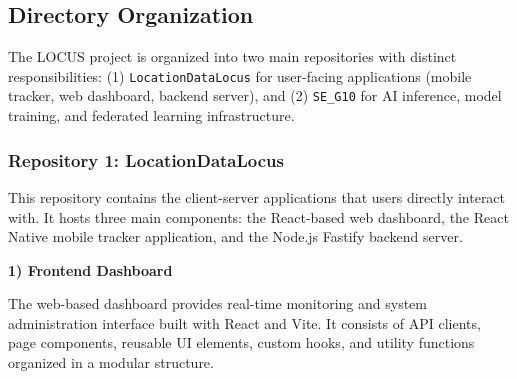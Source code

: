 \documentclass[conference]{IEEEtran}
\begin{document}
\subsection{Directory Organization}

The LOCUS project is organized into two main repositories with distinct responsibilities: (1) \texttt{LocationDataLocus} for user-facing applications (mobile tracker, web dashboard, backend server), and (2) \texttt{SE\_G10} for AI inference, model training, and federated learning infrastructure.

\subsubsection{Repository 1: LocationDataLocus}

This repository contains the client-server applications that users directly interact with. It hosts three main components: the React-based web dashboard, the React Native mobile tracker application, and the Node.js Fastify backend server.

\textbf{1) Frontend Dashboard}

The web-based dashboard provides real-time monitoring and system administration interface built with React and Vite. It consists of API clients, page components, reusable UI elements, custom hooks, and utility functions organized in a modular structure.
\end{document}
